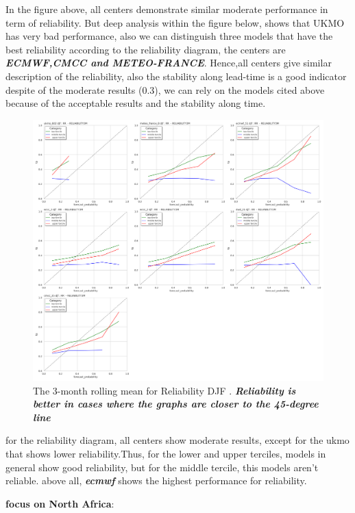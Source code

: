 In the figure above, all centers demonstrate similar moderate performance in term of reliability. But deep analysis within the figure below, shows that UKMO has very bad performance, also we can distinguish three models that have the best reliability according to the reliability diagram, the centers are \textbf{\textit{ECMWF,CMCC and METEO-FRANCE}}. Hence,all centers give similar description of the reliability, also the stability along lead-time is a good indicator despite of the moderate results (0.3), we can rely on the models cited above because of the acceptable results and the stability along time.

\begin{figure}[H]
\centering
\includegraphics[scale=0.3]{plots/prob/rela/rela_diagram_RR_djf.png}
\caption{The 3-month rolling mean for Reliability DJF   . \textbf{\textit{Reliability is better in cases where the graphs are closer to the 45-degree line}}}
\end{figure}

for the reliability diagram, all centers show moderate results, except for the ukmo that shows lower reliability.Thus, for the lower and upper terciles, models in general show good reliability, but for the middle tercile, this models aren't reliable. above all, \textbf{\textit{ecmwf}}  shows the highest performance for reliability.

\vspace{1.5cm}
\textbf{focus on North Africa}:

